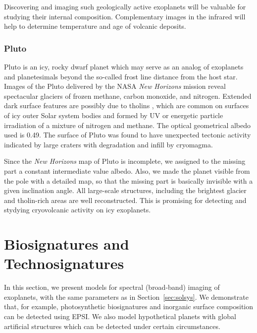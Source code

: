 \documentclass{emulateapj}
\begin{document}
Discovering and imaging such geologically active exoplanets will be
valuable for studying their internal composition. Complementary images
in the infrared will help to determine temperature and age of volcanic deposits.

\subsubsection{Pluto}\label{sec:inve_solsys_surf_pluto}

Pluto is an icy, rocky dwarf planet which may serve as an analog of exoplanets
and planetesimals beyond the so-called frost line distance from the host star. 
Images of the Pluto delivered by the NASA {\em New Horizons} mission reveal spectacular 
glaciers of frozen methane, carbon monoxide, and nitrogen. 
Extended dark surface features are possibly due to tholins \citep{sag79}, which
are common on surfaces of icy outer Solar system bodies and formed by UV or energetic particle
irradiation of a mixture of nitrogen and methane. The optical geometrical albedo used is 0.49.
The surface of Pluto was found to have unexpected tectonic activity indicated by 
large craters with degradation and infill by cryomagma. 

Since the {\em New Horizons} map of Pluto is incomplete, we assigned to the missing part 
a constant intermediate value albedo. Also, we made the planet visible from the pole with
a detailed map, so that the missing part is basically invisible with a given inclination angle. 
All large-scale structures, including the brightest glacier and tholin-rich areas are well 
reconstructed. This is promising for detecting and stydying cryovolcanic activity 
on icy exoplanets. 


\section{Biosignatures and Technosignatures}\label{sec:signat}

In this section, we present models for spectral (broad-band) imaging
of exoplanets, with the same parameters as in Section~\ref{sec:solsys}. 
We demonstrate that, for example, photosynthetic biosignatures and 
inorganic surface composition can be detected using EPSI. 
We also model hypothetical planets with global artificial structures 
which can be detected under certain circumstances.
\end{document}
